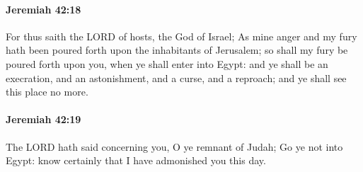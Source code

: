 		\paragraph{Jeremiah 42:18} %
			\label{JEREMIAH-42-18}

			For thus saith the LORD of hosts, the God of Israel; As mine anger and my fury hath been poured forth upon the inhabitants of Jerusalem; so shall my fury be poured forth upon you, when ye shall enter into Egypt: and ye shall be an execration, and an astonishment, and a curse, and a reproach; and ye shall see this place no more.


		\paragraph{Jeremiah 42:19} %
			\label{JEREMIAH-42-19}

			The LORD hath said concerning you, O ye remnant of Judah; Go ye not into Egypt: know certainly that I have admonished you this day.


